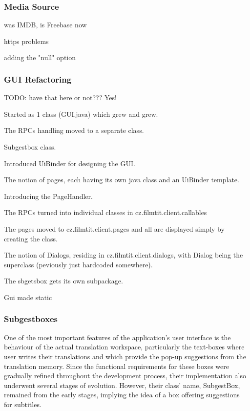 \subsubsection{Media Source}

was IMDB, is Freebase now

https problems

adding the "null" option

\subsubsection{GUI Refactoring}

TODO: have that here or not??? Yes!

Started as 1 class (GUI.java) which grew and grew.

The RPCs handling moved to a separate class.

Subgestbox class.

Introduced UiBinder for designing the GUI.

The notion of pages, each having its own java class and an UiBinder template.

Introducing the PageHandler.

The RPCs turned into individual classes in cz.filmtit.client.callables

The pages moved to cz.filmtit.client.pages and all are displayed simply by creating the class.

The notion of Dialogs, residing in cz.filmtit.client.dialogs, with Dialog being the superclass (peviously just hardcoded somewhere).

The sbgetsbox gets its own subpackage.

Gui made static


\subsubsection{Subgestboxes}

One of the most important features of the application's user interface is the behaviour of the actual translation workspace, particularly the text-boxes where user writes their translations and which provide the pop-up suggestions from the translation memory. Since the functional requirements for these boxes were gradually refined throughout the development process, their implementation also underwent several stages of evolution. However, their class' name, SubgestBox, remained from the early stages, implying the idea of a box offering suggestions for subtitles.

